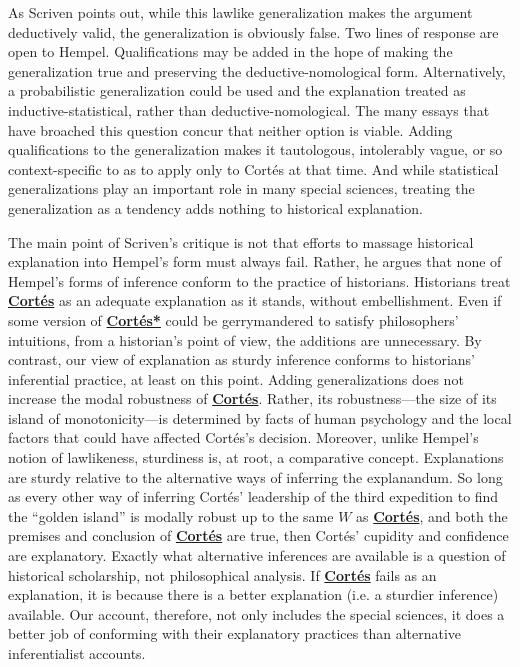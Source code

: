\documentclass[natbib]{svjour3}                     %
\begin{document}
\noindent As Scriven points out, while this lawlike generalization makes the argument deductively valid, the generalization is obviously false.  Two lines of response are open to Hempel.  Qualifications may be added in the hope of making the generalization true and preserving the deductive-nomological form.  Alternatively, a probabilistic generalization could be used and the explanation treated as inductive-statistical, rather than deductive-nomological.  The many essays that have broached this question concur that neither option is viable.  Adding qualifications to the generalization makes it tautologous, intolerably vague, or so context-specific to as to apply only to Cort\'{e}s at that time.  And while statistical generalizations play an important role in many special sciences, treating the generalization as a tendency adds nothing to historical explanation.

The main point of Scriven's critique is not that efforts to massage historical explanation into Hempel's form must always fail. Rather, he argues that none of Hempel's forms of inference conform to the practice of historians.  Historians treat \hyperref[Cortes]{\textbf{Cort\'{e}s}} as an adequate explanation as it stands, without embellishment.  Even if some version of \hyperref[Cortes*]{\textbf{Cort\'{e}s*}} could be gerrymandered to satisfy philosophers' intuitions, from a historian's point of view, the additions are unnecessary. By contrast, our view of explanation as sturdy inference conforms to historians' inferential practice, at least on this point.  Adding generalizations does not increase the modal robustness of \hyperref[Cortes]{\textbf{Cort\'{e}s}}.  Rather, its robustness---the size of its island of monotonicity---is determined by facts of human psychology and the local factors that could have affected Cort\'{e}s's decision.   Moreover, unlike Hempel's notion of lawlikeness, sturdiness is, at root, a comparative concept. Explanations are sturdy relative to the alternative ways of inferring the explanandum. So long as every other way of inferring Cort\'{e}s' leadership of the third expedition to find the ``golden island'' is modally robust up to the same $W$ as \hyperref[Cortes]{\textbf{Cort\'{e}s}}, and both the premises and conclusion of \hyperref[Cortes]{\textbf{Cort\'{e}s}} are true, then Cort\'{e}s' cupidity and confidence are explanatory.   Exactly what alternative inferences are available is a question of historical scholarship, not philosophical analysis.  If \hyperref[Cortes]{\textbf{Cort\'{e}s}} fails as an explanation, it is because there is a better explanation (i.e. a sturdier inference) available. Our account, therefore, not only includes the special sciences, it does a better job of conforming with their explanatory practices than alternative inferentialist accounts. 
\end{document}
